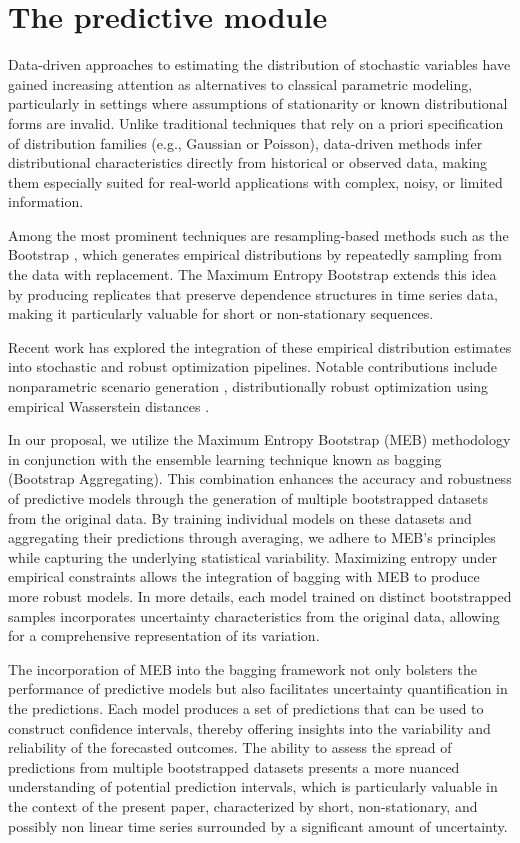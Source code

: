 \documentclass[opre,sglanonrev,11pt]{informs4}
\begin{document}
\section{The predictive module} \label{Sec:forecasting}

Data-driven approaches to estimating the distribution of stochastic variables have gained increasing attention as alternatives to classical parametric modeling, particularly in settings where assumptions of stationarity or known distributional forms are invalid. Unlike traditional techniques that rely on a priori specification of distribution families (e.g., Gaussian or Poisson), data-driven methods infer distributional characteristics directly from historical or observed data, making them especially suited for real-world applications with complex, noisy, or limited information.

Among the most prominent techniques are resampling-based methods such as the Bootstrap \cite{b1}, which generates empirical distributions by repeatedly sampling from the data with replacement. The Maximum Entropy Bootstrap \cite{Vinod2006} extends this idea by producing replicates that preserve dependence structures in time series data, making it particularly valuable for short or non-stationary sequences.

Recent work has explored the integration of these empirical distribution estimates into stochastic and robust optimization pipelines. Notable contributions include nonparametric scenario generation \cite{BM11}, distributionally robust optimization using empirical Wasserstein distances \cite{EK17}. 

In our proposal, we utilize the Maximum Entropy Bootstrap (MEB) methodology in conjunction with the ensemble learning technique known as bagging (Bootstrap Aggregating). This combination enhances the accuracy and robustness of predictive models through the generation of multiple bootstrapped datasets from the original data. By training individual models on these datasets and aggregating their predictions through averaging, we adhere to MEB's principles while capturing the underlying statistical variability. Maximizing entropy under empirical constraints allows the integration of bagging with MEB to produce more robust models. In more details, each model trained on distinct bootstrapped samples incorporates uncertainty characteristics from the original data, allowing for a comprehensive representation of its variation.

The incorporation of MEB into the bagging framework not only bolsters the performance of predictive models but also facilitates uncertainty quantification in the predictions. Each model produces a set of predictions that can be used to construct confidence intervals, thereby offering insights into the variability and reliability of the forecasted outcomes. The ability to assess the spread of predictions from multiple bootstrapped datasets presents a more nuanced understanding of potential prediction intervals, which is particularly valuable in the context of the present paper, characterized by short, non-stationary, and possibly non linear time series surrounded by a significant amount of uncertainty.
\end{document}
